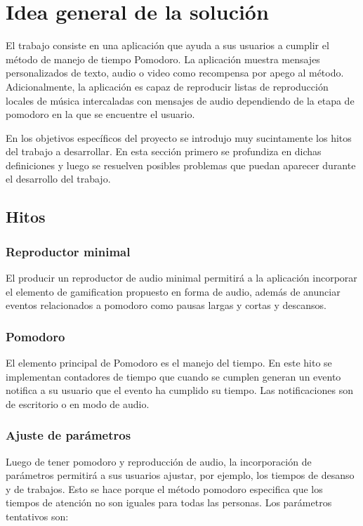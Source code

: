 \documentclass[12pt,letterpaper]{report}
\begin{document}
\newpage
\section{Idea general de la solución}\label{idea-general-de-la-solucion}

El trabajo consiste en una aplicación que ayuda a sus usuarios a cumplir el método de manejo de tiempo Pomodoro. La
aplicación muestra mensajes personalizados de texto, audio o video como recompensa por apego al método. Adicionalmente,
la aplicación es capaz de reproducir listas de reproducción locales de música intercaladas con mensajes de audio
dependiendo de la etapa de pomodoro en la que se encuentre el usuario.

En los objetivos específicos del proyecto se introdujo muy sucintamente los hitos del trabajo a desarrollar. En esta
sección primero se profundiza en dichas definiciones y luego se resuelven posibles problemas que puedan aparecer durante
el desarrollo del trabajo.

\subsection{Hitos}

\subsubsection{Reproductor minimal}

El producir un reproductor de audio minimal permitirá a la aplicación incorporar el elemento de gamification propuesto
en forma de audio, además de anunciar eventos relacionados a pomodoro como pausas largas y cortas y descansos.

\subsubsection{Pomodoro}

El elemento principal de Pomodoro es el manejo del tiempo. En este hito se implementan contadores de tiempo que cuando
se cumplen generan un evento notifica a su usuario que el evento ha cumplido su tiempo. Las notificaciones son de
escritorio o en modo de audio.

\subsubsection{Ajuste de parámetros}

Luego de tener pomodoro y reproducción de audio, la incorporación de parámetros permitirá a sus usuarios ajustar, por
ejemplo, los tiempos de desanso y de trabajos. Esto se hace porque el método pomodoro especifica que los tiempos de
atención no son iguales para todas las personas. Los parámetros tentativos son:
\end{document}
